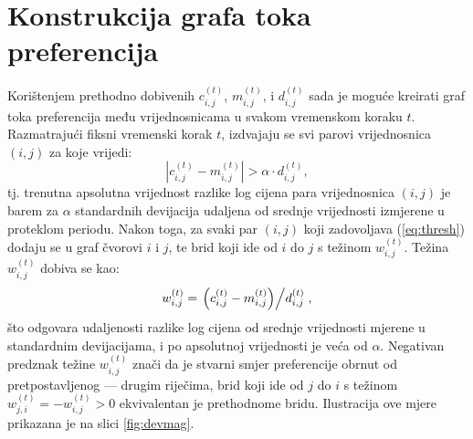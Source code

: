 \documentclass[lmodern, utf8, diplomski, numeric]{fer}
\begin{document}
  \section{Konstrukcija grafa toka preferencija}
  \label{sub:creating-graph}
  Korištenjem prethodno dobivenih $c_{i,j}^{\left(t\right)}$, $m_{i,j}^{\left(t\right)}$, i $d_{i,j}^{\left(t\right)}$ sada je moguće kreirati graf toka preferencija među vrijednosnicama u svakom vremenskom koraku $t$.
  Razmatrajući fiksni vremenski korak $t$, izdvajaju se svi parovi vrijednosnica $(i,j)$ za koje vrijedi:
  \begin{equation}
  \label{eq:thresh}
  \left| c_{i,j}^{\left(t\right)} - m_{i,j}^{\left(t\right)} \right| > \alpha \cdot d_{i,j}^{\left(t\right)},
  \end{equation}
  tj. trenutna apsolutna vrijednost razlike log cijena para vrijednosnica $(i,j)$ je barem za $\alpha$ standardnih devijacija udaljena od srednje vrijednosti izmjerene u proteklom periodu.
  Nakon toga, za svaki par $(i,j)$ koji zadovoljava (\ref{eq:thresh}) dodaju se u graf čvorovi $i$ i $j$, te brid koji ide od $i$ do $j$ s težinom $w_{i,j}^{\left(t\right)}$.
  Težina $w_{i,j}^{\left(t\right)}$ dobiva se kao:
  \begin{equation}
  \label{eq:weight}
  w_{i,j}^{\left(t\right)} = \left. \left(c_{i,j}^{\left(t\right)} - m_{i,j}^{\left(t\right)}\right) \middle/ d_{i,j}^{\left(t\right)} \right.,
  \end{equation}
  što odgovara udaljenosti razlike log cijena od srednje vrijednosti mjerene u standardnim devijacijama, i po apsolutnoj vrijednosti je veća od $\alpha$.
  Negativan predznak težine $w_{i,j}^{\left(t\right)}$ znači da je stvarni smjer preferencije obrnut od pretpostavljenog --- drugim riječima, brid koji ide od $j$ do $i$ s težinom $w_{j,i}^{\left(t\right)} = -w_{i,j}^{\left(t\right)} > 0$ ekvivalentan je prethodnome bridu.
  Ilustracija ove mjere prikazana je na slici \ref{fig:devmag}.
  
\end{document}
